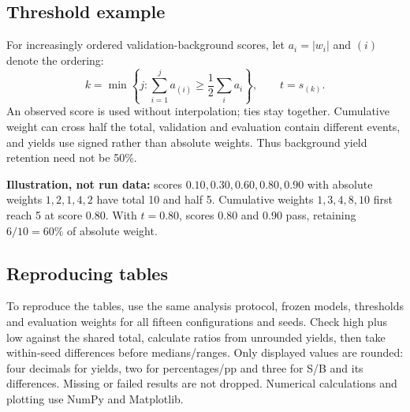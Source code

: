 \documentclass[11pt,a4paper]{article}
\begin{document}
\subsection{Threshold example}\label{app:threshold}
For increasingly ordered validation-background scores, let $a_i=|w_i|$ and $(i)$ denote the ordering:
\[
 k=\min\left\{j:\sum_{i=1}^{j}a_{(i)}\geq\frac12\sum_i a_i\right\},
 \qquad t=s_{(k)}.
\]
An observed score is used without interpolation; ties stay together. Cumulative weight can cross half the total, validation and evaluation contain different events, and yields use signed rather than absolute weights.
Thus background yield retention need not be 50\%.

\textbf{Illustration, not run data:} scores $0.10,0.30,0.60,0.80,0.90$ with absolute weights $1,2,1,4,2$ have total 10 and half 5.
Cumulative weights $1,3,4,8,10$ first reach 5 at score 0.80. With $t=0.80$, scores 0.80 and 0.90 pass, retaining $6/10=60\%$ of absolute weight.

\subsection{Reproducing tables}
To reproduce the tables, use the same analysis protocol, frozen models, thresholds and evaluation weights for all fifteen configurations and seeds.
Check high plus low against the shared total, calculate ratios from unrounded yields, then take within-seed differences before medians/ranges.
Only displayed values are rounded: four decimals for yields, two for percentages/pp and three for S/B and its differences. Missing or failed results are not dropped.
Numerical calculations and plotting use NumPy and Matplotlib.
\end{document}
